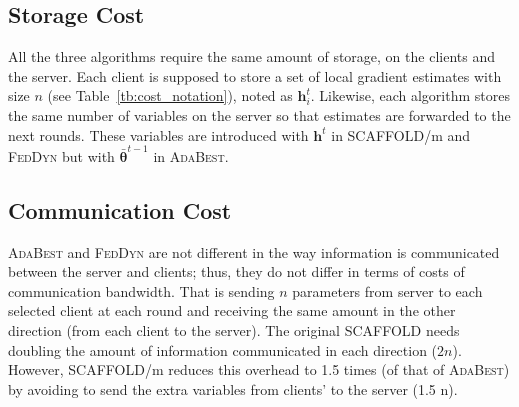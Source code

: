 \documentclass[runningheads]{llncs}
\def\vtheta{{\bm{\theta}}}
\def\vh{{\bm{h}}}
\newcommand*\mean[1]{\bar{#1}}
\newcommand{\scaffold}{\textsc{SCAFFOLD}\xspace}
\newcommand{\feddyn}{\textsc{FedDyn}\xspace}
\newcommand{\ours}{\textsc{AdaBest}\xspace}
\begin{document}
\subsection{Storage Cost}
All the three algorithms require the same amount of storage, on the clients and the server. Each client is supposed to store a set of local gradient estimates with size $n$ (see Table~\ref{tb:cost_notation}), noted as $\vh_i^{t}$. Likewise, each algorithm stores the same number of variables on the server so that estimates are forwarded to the next rounds. These variables are introduced with $\vh^t$ in \scaffold/m and \feddyn but with $\mean{\vtheta}^{t-1}$ in \ours. 

\subsection{Communication Cost}
\ours and \feddyn are not different in the way information is communicated between the server and clients; thus, they do not differ in terms of costs of communication bandwidth. That is sending $n$ parameters from server to each selected client at each round and receiving the same amount in the other direction (from each client to the server). The original \scaffold needs doubling the amount of information communicated in each direction ($2 n$). However, \scaffold/m reduces this overhead to 1.5 times (of that of \ours) by avoiding to send the extra variables from clients' to the server (1.5 n).
\end{document}
